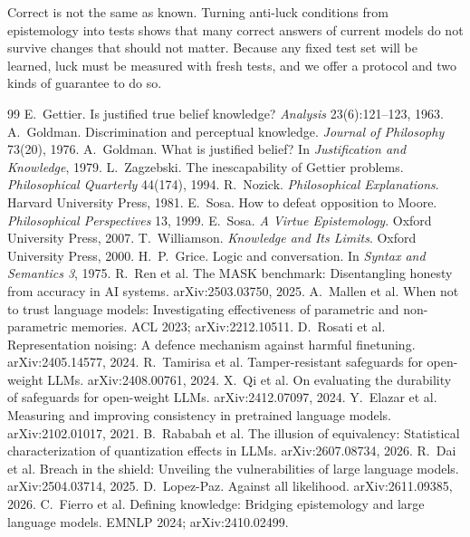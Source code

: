 \documentclass[10pt]{article}
\begin{document}
Correct is not the same as known. Turning anti-luck conditions from epistemology into tests shows that many correct answers of current models do not survive changes that should not matter. Because any fixed test set will be learned, luck must be measured with fresh tests, and we offer a protocol and two kinds of guarantee to do so.

{\small
\begin{thebibliography}{99}\setlength{\itemsep}{0pt}
 E.~Gettier. Is justified true belief knowledge? \textit{Analysis} 23(6):121--123, 1963.
 A.~Goldman. Discrimination and perceptual knowledge. \textit{Journal of Philosophy} 73(20), 1976.
 A.~Goldman. What is justified belief? In \textit{Justification and Knowledge}, 1979.
 L.~Zagzebski. The inescapability of Gettier problems. \textit{Philosophical Quarterly} 44(174), 1994.
 R.~Nozick. \textit{Philosophical Explanations}. Harvard University Press, 1981.
 E.~Sosa. How to defeat opposition to Moore. \textit{Philosophical Perspectives} 13, 1999.
 E.~Sosa. \textit{A Virtue Epistemology}. Oxford University Press, 2007.
 T.~Williamson. \textit{Knowledge and Its Limits}. Oxford University Press, 2000.
 H.~P.~Grice. Logic and conversation. In \textit{Syntax and Semantics 3}, 1975.
 R.~Ren et al. The MASK benchmark: Disentangling honesty from accuracy in AI systems. arXiv:2503.03750, 2025.
 A.~Mallen et al. When not to trust language models: Investigating effectiveness of parametric and non-parametric memories. ACL 2023; arXiv:2212.10511.
 D.~Rosati et al. Representation noising: A defence mechanism against harmful finetuning. arXiv:2405.14577, 2024.
 R.~Tamirisa et al. Tamper-resistant safeguards for open-weight LLMs. arXiv:2408.00761, 2024.
 X.~Qi et al. On evaluating the durability of safeguards for open-weight LLMs. arXiv:2412.07097, 2024.
 Y.~Elazar et al. Measuring and improving consistency in pretrained language models. arXiv:2102.01017, 2021.
 B.~Rababah et al. The illusion of equivalency: Statistical characterization of quantization effects in LLMs. arXiv:2607.08734, 2026.
 R.~Dai et al. Breach in the shield: Unveiling the vulnerabilities of large language models. arXiv:2504.03714, 2025.
 D.~Lopez-Paz. Against all likelihood. arXiv:2611.09385, 2026.
 C.~Fierro et al. Defining knowledge: Bridging epistemology and large language models. EMNLP 2024; arXiv:2410.02499.

\end{thebibliography}}
\end{document}
